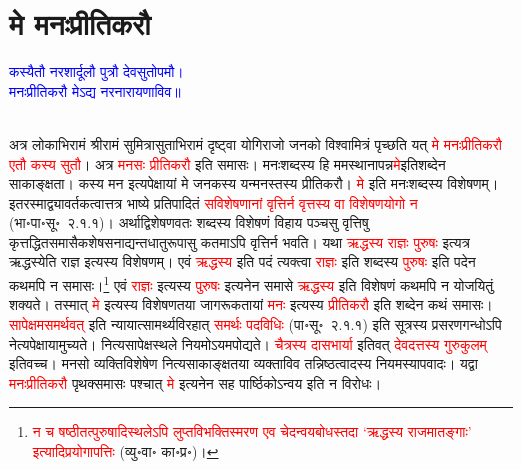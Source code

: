 \section[मे मनःप्रीतिकरौ]{मे मनःप्रीतिकरौ}
\centering\textcolor{blue}{कस्यैतौ नरशार्दूलौ पुत्रौ देवसुतोपमौ।\nopagebreak\\
मनःप्रीतिकरौ मेऽद्य नरनारायणाविव॥}\nopagebreak\\
\\
\begin{sloppypar}\justifying\noindent\hspace{10mm} अत्र लोकाभिरामं श्रीरामं सुमित्रा\-सुताभिरामं दृष्ट्वा
योगिराजो जनको विश्वामित्रं पृच्छति यत् \textcolor{red}{मे मनः\-प्रीति\-करौ एतौ कस्य सुतौ}। अत्र \textcolor{red}{मनसः प्रीति\-करौ} इति समासः। मनः\-शब्दस्य हि मम\-स्थानापन्न\-\textcolor{red}{मे}\-इति\-शब्देन साकाङ्क्षता। कस्य मन इत्यपेक्षायां मे जनकस्य यन्मनस्तस्य प्रीतिकरौ। \textcolor{red}{मे} इति मनः\-शब्दस्य विशेषणम्। इतरस्माद्व्यावर्तकत्वात्तत्र भाष्ये प्रतिपादितं \textcolor{red}{सविशेषणानां वृत्तिर्न वृत्तस्य वा विशेषण\-योगो न} (भा॰पा॰सू॰~२.१.१)। अर्थाद्विशेषणवतः शब्दस्य विशेषणं विहाय पञ्चसु वृत्तिषु कृत्तद्धित\-समासैक\-शेष\-सनाद्यन्त\-धातु\-रूपासु कतमाऽपि वृत्तिर्न भवति। यथा \textcolor{red}{ऋद्धस्य राज्ञः पुरुषः} इत्यत्र ऋद्धस्येति राज्ञ इत्यस्य विशेषणम्। एवं \textcolor{red}{ऋद्धस्य} इति पदं त्यक्त्वा \textcolor{red}{राज्ञः} इति शब्दस्य \textcolor{red}{पुरुषः} इति पदेन कथमपि न समासः।\footnote{\textcolor{red}{न च षष्ठी\-तत्पुरुषादि\-स्थलेऽपि लुप्त\-विभक्ति\-स्मरण एव चेदन्वयबोधस्तदा ‘ऋद्धस्य राजमातङ्गाः’ इत्यादि\-प्रयोगापत्तिः} (व्यु॰वा॰ का॰प्र॰)।} एवं \textcolor{red}{राज्ञः} इत्यस्य \textcolor{red}{पुरुषः} इत्यनेन समासे \textcolor{red}{ऋद्धस्य} इति विशेषणं कथमपि न योजयितुं शक्यते। तस्मात् \textcolor{red}{मे} इत्यस्य विशेषणतया जागरूकतायां \textcolor{red}{मनः} इत्यस्य \textcolor{red}{प्रीति\-करौ} इति शब्देन कथं समासः। \textcolor{red}{सापेक्षमसमर्थवत्‌} इति न्यायात्सामर्थ्य\-विरहात् \textcolor{red}{समर्थः पद\-विधिः} (पा॰सू॰~२.१.१) इति सूत्रस्य प्रसरण\-गन्धोऽपि नेत्यपेक्षायामुच्यते। नित्य\-सापेक्ष\-स्थले नियमोऽयमपोद्यते। \textcolor{red}{चैत्रस्य दास\-भार्या} इतिवत् \textcolor{red}{देवदत्तस्य गुरु\-कुलम्‌} इतिवच्च। मनसो व्यक्ति\-विशेषेण नित्य\-साकाङ्क्षतया व्यक्ताविव तन्निष्ठत्वादस्य नियमस्यापवादः। यद्वा \textcolor{red}{मनः\-प्रीति\-करौ} पृथक्समासः पश्चात् \textcolor{red}{मे} इत्यनेन सह पार्ष्ठिकोऽन्वय इति न विरोधः।\end{sloppypar}
